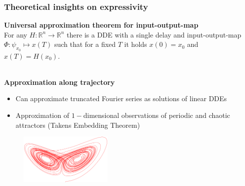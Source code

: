\documentclass[11pt,aspectratio=169]{beamer}
\newcommand{\R}{\mathbb{R}}
\begin{document}
\begin{frame}[t]
\end{frame}


\begin{frame}[t]
    \frametitle{Theoretical insights on expressivity}
    \textbf{Universal approximation theorem for input-output-map}\\\vspace{0.1cm}
    For any $H:\R^n \to\R^n$ there is a DDE with a single delay and input-output-map $\Phi: \psi_{x_0}\mapsto x(T)$ such that for a fixed $T$ it holds $x(0)=x_0$ and $x(T)=H(x_0)$.\\\vspace{0.1cm}
    \\
    \vspace{0.25cm}
    \pause
    \textbf{Approximation along trajectory}
    \begin{itemize}
        \item Can approximate truncated Fourier series as solutions of linear DDEs
        \item Approximation of $1-$dimensional observations of periodic and chaotic attractors (Takens Embedding Theorem)
     \end{itemize}
    \begin{figure}
        \centering
        \includegraphics[width=0.4\textwidth]{figures/lorenz.png}
    \end{figure}
\end{frame}

\end{document}

